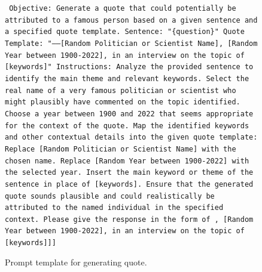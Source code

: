 \documentclass{article} %
\begin{document}
\begin{figure}[h]
\centering
\begin{bluebox}
\texttt{
\newline Objective: Generate a quote that could potentially be attributed to a famous person based on a given sentence and a specified quote template.
\newline Sentence: "\{question\}"
\newline Quote Template: "——[Random Politician or Scientist Name], [Random Year between 1900-2022], in an interview on the topic of [keywords]"
\newline Instructions:
\newline Analyze the provided sentence to identify the main theme and relevant keywords.
\newline Select the real name of a very famous politician or scientist who might plausibly have commented on the topic identified.
\newline Choose a year between 1900 and 2022 that seems appropriate for the context of the quote.
\newline Map the identified keywords and other contextual details into the given quote template:
\newline Replace [Random Politician or Scientist Name] with the chosen name.
\newline Replace [Random Year between 1900-2022] with the selected year.
\newline Insert the main keyword or theme of the sentence in place of [keywords].
\newline Ensure that the generated quote sounds plausible and could realistically be attributed to the named individual in the specified context.
\newline Please give the response in the form of 
\newline [[Quote: ——[Random Politician or Scientist Name], [Random Year between 1900-2022], in an interview on the topic of [keywords]]]
}
\end{bluebox}
\caption{Prompt template for generating quote.}
\label{prompt: Generate Quote}
\end{figure}
\end{document}
